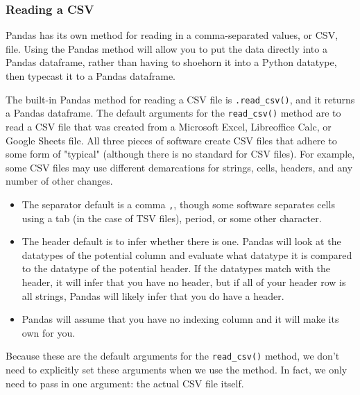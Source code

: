 \subsubsection{Reading a CSV}
Pandas has its own method for reading in a comma-separated values, or CSV, file. Using the Pandas method will allow you to put the data directly into a Pandas dataframe, rather than having to shoehorn it into a Python datatype, then typecast it to a Pandas dataframe.\par
{}
The built-in Pandas method for reading a CSV file is \verb|.read_csv()|, and it returns a Pandas dataframe. The default arguments for the \verb|read_csv()| method are to read a CSV file that was created from a Microsoft Excel, Libreoffice Calc, or Google Sheets file. All three pieces of software create CSV files that adhere to some form of "typical" (although there is no standard for CSV files). For example, some CSV files may use different demarcations for strings, cells, headers, and any number of other changes.
\begin{itemize}
    \item The separator default is a comma \verb|,|, though some software separates cells using a tab (in the case of TSV files), period, or some other character.
    \item The header default is to infer whether there is one. Pandas will look at the datatypes of the potential column and evaluate what datatype it is compared to the datatype of the potential header. If the datatypes match with the header, it will infer that you have no header, but if all of your header row is all strings, Pandas will likely infer that you do have a header.
    \item Pandas will assume that you have no indexing column and it will make its own for you.
\end{itemize}
Because these are the default arguments for the \verb|read_csv()| method, we don't need to explicitly set these arguments when we use the method. In fact, we only need to pass in one argument: the actual CSV file itself.\par
